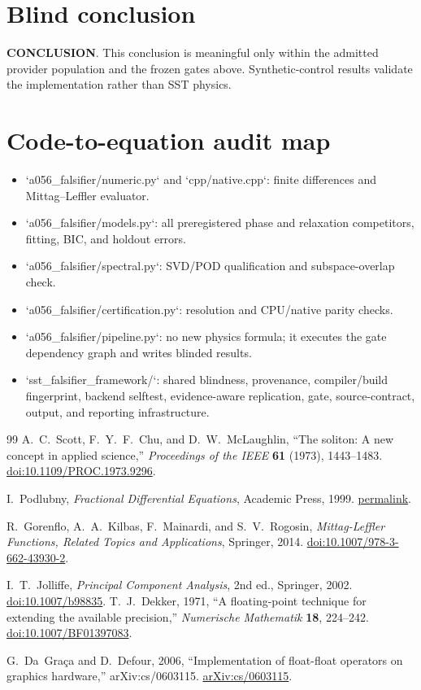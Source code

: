 \documentclass[11pt]{article}
\begin{document}
\section{Blind conclusion}
\textbf{{{CONCLUSION}}}.  This conclusion is meaningful only within the admitted provider population and the frozen gates above.  Synthetic-control results validate the implementation rather than SST physics.

\section{Code-to-equation audit map}
\begin{itemize}
\item `a056\_falsifier/numeric.py` and `cpp/native.cpp`: finite differences and Mittag--Leffler evaluator.
\item `a056\_falsifier/models.py`: all preregistered phase and relaxation competitors, fitting, BIC, and holdout errors.
\item `a056\_falsifier/spectral.py`: SVD/POD qualification and subspace-overlap check.
\item `a056\_falsifier/certification.py`: resolution and CPU/native parity checks.
\item `a056\_falsifier/pipeline.py`: no new physics formula; it executes the gate dependency graph and writes blinded results.
\item `sst\_falsifier\_framework/`: shared blindness, provenance, compiler/build fingerprint, backend selftest, evidence-aware replication, gate, source-contract, output, and reporting infrastructure.
\end{itemize}

\begin{thebibliography}{99}
A.~C.~Scott, F.~Y.~F.~Chu, and D.~W.~McLaughlin,
``The soliton: A new concept in applied science,''
\emph{Proceedings of the IEEE} \textbf{61} (1973), 1443--1483.
\href{https://doi.org/10.1109/PROC.1973.9296}{doi:10.1109/PROC.1973.9296}.

I.~Podlubny,
\emph{Fractional Differential Equations},
Academic Press, 1999.
\href{https://www.sciencedirect.com/bookseries/mathematics-in-science-and-engineering/vol/198/suppl/C}{permalink}.

R.~Gorenflo, A.~A.~Kilbas, F.~Mainardi, and S.~V.~Rogosin,
\emph{Mittag-Leffler Functions, Related Topics and Applications}, Springer, 2014.
\href{https://doi.org/10.1007/978-3-662-43930-2}{doi:10.1007/978-3-662-43930-2}.

I.~T.~Jolliffe,
\emph{Principal Component Analysis}, 2nd ed., Springer, 2002.
\href{https://doi.org/10.1007/b98835}{doi:10.1007/b98835}.
T.~J.~Dekker, 1971, ``A floating-point technique for extending the available precision,''
\emph{Numerische Mathematik} \textbf{18}, 224--242.
\href{https://doi.org/10.1007/BF01397083}{doi:10.1007/BF01397083}.

G.~Da~Graça and D.~Defour, 2006, ``Implementation of float-float operators on graphics hardware,'' arXiv:cs/0603115.
\href{https://arxiv.org/abs/cs/0603115}{arXiv:cs/0603115}.
\end{thebibliography}
\end{document}
